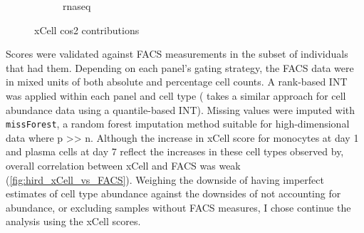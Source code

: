 \begin{figure}
\begin{subfigure}[b]{0.49\textwidth}
        \caption{rnaseq}
    \end{subfigure}%
    \caption{xCell cos2 contributions}
    \label{fig:hird_xCell_cos2}
\end{figure}

Scores were validated against \gls{FACS} measurements in the subset of individuals that had them.
Depending on each panel's gating strategy, the \gls{FACS} data were in mixed units of both absolute and percentage cell counts.
A rank-based \gls{INT} was applied within each panel and cell type (\autocite{astle2016AllelicLandscapeHuman} takes a similar approach for cell abundance data using a quantile-based \gls{INT}).
%
Missing values were imputed with \texttt{missForest}, a random forest imputation method suitable for high-dimensional data where p >> n.
Although the increase in xCell score for monocytes at day 1 and plasma cells at day 7 reflect the increases in these cell types observed by\autocite{sobolev2016AdjuvantedInfluenzaH1N1Vaccination}, overall correlation between xCell and \gls{FACS} was weak (\autoref{fig:hird_xCell_vs_FACS}).
Weighing the downside of having imperfect estimates of cell type abundance against the downsides of not accounting for abundance, or excluding samples without \gls{FACS} measures, I chose continue the analysis using the xCell scores.


